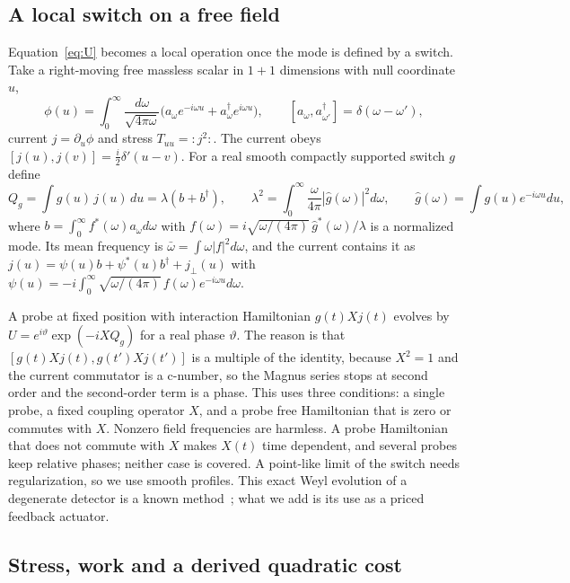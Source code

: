 \documentclass[aps,pre,onecolumn,superscriptaddress,floatfix,longbibliography]{revtex4-2}
\begin{document}
\subsection{A local switch on a free field}
\label{sec:switch}

Equation~\eqref{eq:U} becomes a local operation once the mode is defined by a switch. Take a right-moving free massless scalar in $1+1$ dimensions with null coordinate $u$,
\begin{equation}
\phi(u)=\int_0^\infty\frac{d\omega}{\sqrt{4\pi\omega}}\bigl(a_\omega e^{-i\omega u}+a_\omega^\dagger e^{i\omega u}\bigr),\qquad
[a_\omega,a_{\omega'}^\dagger]=\delta(\omega-\omega'),
\end{equation}
current $j=\partial_u\phi$ and stress $T_{uu}=:j^2:$. The current obeys $[j(u),j(v)]=\tfrac i2\delta'(u-v)$. For a real smooth compactly supported switch $g$ define
\begin{equation}
Q_g=\int g(u)\,j(u)\,du=\lambda(b+b^\dagger),\qquad
\lambda^2=\int_0^\infty\frac{\omega}{4\pi}|\hat g(\omega)|^2d\omega,\qquad
\hat g(\omega)=\int g(u)e^{-i\omega u}du,
\label{eq:Qg}
\end{equation}
where $b=\int_0^\infty f^*(\omega)a_\omega d\omega$ with $f(\omega)=i\sqrt{\omega/(4\pi)}\,\hat g^*(\omega)/\lambda$ is a normalized mode. Its mean frequency is $\bar\omega=\int\omega|f|^2d\omega$, and the current contains it as $j(u)=\psi(u)b+\psi^*(u)b^\dagger+j_\perp(u)$ with $\psi(u)=-i\int_0^\infty\sqrt{\omega/(4\pi)}\,f(\omega)e^{-i\omega u}d\omega$.

A probe at fixed position with interaction Hamiltonian $g(t)Xj(t)$ evolves by $U=e^{i\vartheta}\exp(-iXQ_g)$ for a real phase $\vartheta$. The reason is that $[g(t)Xj(t),g(t')Xj(t')]$ is a multiple of the identity, because $X^2=1$ and the current commutator is a c-number, so the Magnus series stops at second order and the second-order term is a phase. This uses three conditions: a single probe, a fixed coupling operator $X$, and a probe free Hamiltonian that is zero or commutes with $X$. Nonzero field frequencies are harmless. A probe Hamiltonian that does not commute with $X$ makes $X(t)$ time dependent, and several probes keep relative phases; neither case is covered. A point-like limit of the switch needs regularization, so we use smooth profiles. This exact Weyl evolution of a degenerate detector is a known method~\cite{Landulfo2016,Cozzella2020}; what we add is its use as a priced feedback actuator.

\subsection{Stress, work and a derived quadratic cost}
\label{sec:stress}
\end{document}
